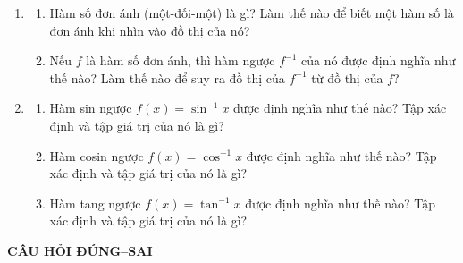 \begin{minipage}[t]{0.485\textwidth}
\begin{enumerate}[label=\textbf{\arabic*.}, leftmargin=1.4em, itemsep=3.5pt, topsep=1pt, parsep=0pt, start=9]
    \item 
    \begin{enumerate}[label=\textsf{(\alph*)}, leftmargin=1.3em, itemsep=1.5pt, topsep=1pt]
        \item Hàm số đơn ánh (một-đối-một) là gì? Làm thế nào để biết một hàm số là đơn ánh khi nhìn vào đồ thị của nó?
        \item Nếu $f$ là hàm số đơn ánh, thì hàm ngược $f^{-1}$ của nó được định nghĩa như thế nào? Làm thế nào để suy ra đồ thị của $f^{-1}$ từ đồ thị của $f$?
    \end{enumerate}

    \item 
    \begin{enumerate}[label=\textsf{(\alph*)}, leftmargin=1.3em, itemsep=1.5pt, topsep=1pt]
        \item Hàm sin ngược $f(x) = \sin^{-1} x$ được định nghĩa như thế nào? Tập xác định và tập giá trị của nó là gì?
        \item Hàm cosin ngược $f(x) = \cos^{-1} x$ được định nghĩa như thế nào? Tập xác định và tập giá trị của nó là gì?
        \item Hàm tang ngược $f(x) = \tan^{-1} x$ được định nghĩa như thế nào? Tập xác định và tập giá trị của nó là gì?
    \end{enumerate}
\end{enumerate}
\end{minipage}

\vspace{0.9em}

\noindent
{\fontsize{10}{12}\selectfont\textbf{\textsf{\color{stewartcyan}CÂU HỎI ĐÚNG--SAI}}}

\vspace{0.4em}

